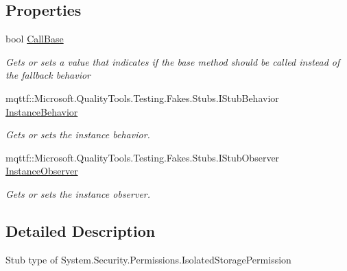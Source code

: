 \subsection*{Properties}
\begin{DoxyCompactItemize}
\item 
bool \hyperlink{class_system_1_1_security_1_1_permissions_1_1_fakes_1_1_stub_isolated_storage_permission_af4ad8358b1e7a1df10043b8a935ecba2}{Call\-Base}
\begin{DoxyCompactList}\small\item\em Gets or sets a value that indicates if the base method should be called instead of the fallback behavior\end{DoxyCompactList}\item 
mqttf\-::\-Microsoft.\-Quality\-Tools.\-Testing.\-Fakes.\-Stubs.\-I\-Stub\-Behavior \hyperlink{class_system_1_1_security_1_1_permissions_1_1_fakes_1_1_stub_isolated_storage_permission_a160585ca8b86671d8b89ff22af0afd45}{Instance\-Behavior}
\begin{DoxyCompactList}\small\item\em Gets or sets the instance behavior.\end{DoxyCompactList}\item 
mqttf\-::\-Microsoft.\-Quality\-Tools.\-Testing.\-Fakes.\-Stubs.\-I\-Stub\-Observer \hyperlink{class_system_1_1_security_1_1_permissions_1_1_fakes_1_1_stub_isolated_storage_permission_a4f0ca789260abe49d5f01d4f8f6db975}{Instance\-Observer}
\begin{DoxyCompactList}\small\item\em Gets or sets the instance observer.\end{DoxyCompactList}\end{DoxyCompactItemize}


\subsection{Detailed Description}
Stub type of System.\-Security.\-Permissions.\-Isolated\-Storage\-Permission



